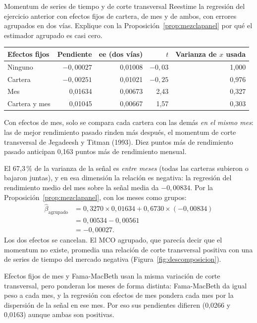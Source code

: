 \begin{ejresuelto}{Momentum de series de tiempo y de corte transversal}\label{ej:descomposicion}
\enunciado Reestime la regresión del ejercicio anterior con efectos fijos de cartera, de mes y de ambos, con errores agrupados en dos
vías. Explique con la Proposición~\ref{prop:mezclapanel} por qué el estimador agrupado es casi cero.

\solucion
{}
\begin{center}\small
\begin{tabular}{@{}lrrrr@{}}
\toprule
Efectos fijos & Pendiente & ee (dos vías) & $t$ & Varianza de $x$ usada \\
\midrule
Ninguno & $-0{,}00027$ & 0,01008 & $-0{,}03$ & 1,000 \\
Cartera & $-0{,}00251$ & 0,01021 & $-0{,}25$ & 0,976 \\
Mes & 0,01634 & 0,00673 & 2,43 & 0,327 \\
Cartera y mes & 0,01045 & 0,00667 & 1,57 & 0,303 \\
\bottomrule
\end{tabular}
\end{center}
Con efectos de mes, solo se compara cada cartera con las demás \emph{en el mismo mes}: las de mejor rendimiento pasado rinden más
después, el momentum de corte transversal de Jegadeesh y Titman (1993). Diez puntos más de rendimiento pasado anticipan 0,163 puntos
más de rendimiento mensual.

 El 67,3\,\% de la varianza de la señal es \emph{entre meses} (todas las carteras subieron o bajaron
juntas), y en esa dimensión la relación es negativa: la regresión del rendimiento medio del mes sobre la señal media da $-0{,}00834$. Por
la Proposición~\ref{prop:mezclapanel}, con los meses como grupos:
\begin{align*}
  \hat\beta_{\text{agrupado}} &= 0{,}3270\times0{,}01634+0{,}6730\times(-0{,}00834)\\
                              &= 0{,}00534-0{,}00561\\
                              &= -0{,}00027 .
\end{align*}
Los dos efectos se cancelan. El MCO agrupado, que parecía decir que el momentum no existe, promedia una relación de corte transversal
positiva con una de series de tiempo del mercado negativa (Figura~\ref{fig:descomposicion}).

 Efectos fijos de mes y Fama-MacBeth usan la misma variación de corte transversal, pero
ponderan los meses de forma distinta: Fama-MacBeth da igual peso a cada mes, y la regresión con efectos de mes pondera cada mes por la
dispersión de la señal en ese mes. Por eso sus pendientes difieren (0,0266 y 0,0163) aunque ambas son positivas.


\end{ejresuelto}
